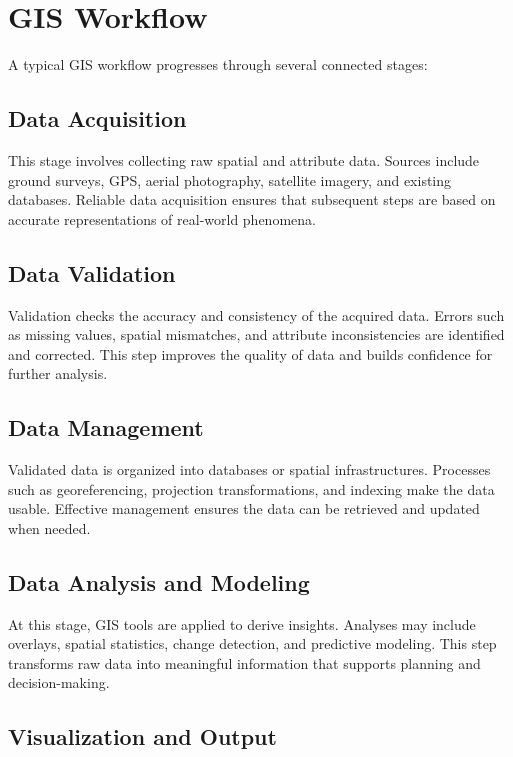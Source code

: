\documentclass[
  11pt,
  letterpaper,
]{book}
\begin{document}
\section{GIS Workflow}\label{gis-workflow}

A typical GIS workflow progresses through several connected stages:

\subsection{Data Acquisition}\label{data-acquisition}

This stage involves collecting raw spatial and attribute data. Sources
include ground surveys, GPS, aerial photography, satellite imagery, and
existing databases. Reliable data acquisition ensures that subsequent
steps are based on accurate representations of real-world phenomena.

\subsection{Data Validation}\label{data-validation}

Validation checks the accuracy and consistency of the acquired data.
Errors such as missing values, spatial mismatches, and attribute
inconsistencies are identified and corrected. This step improves the
quality of data and builds confidence for further analysis.

\subsection{Data Management}\label{data-management}

Validated data is organized into databases or spatial infrastructures.
Processes such as georeferencing, projection transformations, and
indexing make the data usable. Effective management ensures the data can
be retrieved and updated when needed.

\subsection{Data Analysis and
Modeling}\label{data-analysis-and-modeling}

At this stage, GIS tools are applied to derive insights. Analyses may
include overlays, spatial statistics, change detection, and predictive
modeling. This step transforms raw data into meaningful information that
supports planning and decision-making.

\subsection{Visualization and Output}\label{visualization-and-output}
\end{document}

